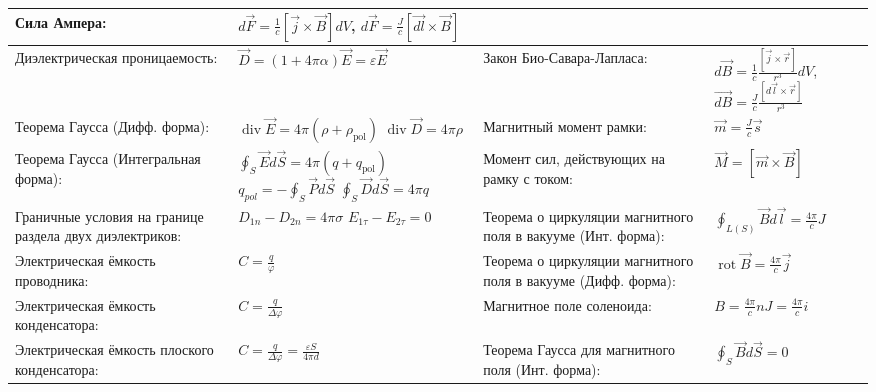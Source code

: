 \documentclass{article}
\begin{document}
\begin{tabular}{ |p{6cm}|p{3.5cm}|p{6cm}|p{3.5cm}|  }
Сила Ампера: & 
$d \vec{F}=\frac{1}{c} [\vec{j} \times \vec{B}] d V$,
$d \vec{F}=\frac{J}{c} [\vec{d{l}} \times \vec{B}]$\\
\hline
Диэлектрическая проницаемость: & $\vec{D}=(1+4 \pi \alpha) \vec{E}=\varepsilon \vec{E}$ &
Закон Био-Савара-Лапласа: & 
$d \vec{B}=\frac{1}{c} \frac{[\vec{j} \times \vec{r}]}{r^{3}} d V$,
$\vec{d{B}}=\frac{J}{c} \frac{[d \vec{l} \times \vec{r}]}{r^{3}}$\\
\hline
Теорема Гаусса (Дифф. форма): & 
$\operatorname{div}{\vec{E}} = 4 \pi \left( \rho+\rho_{\mathrm{pol}} \right)$
$\operatorname{div}{\vec{D}} = 4 \pi \rho$ & Магнитный момент рамки: & $\vec{m}=\frac{J}{c} \vec{s}$ \\
\hline
Теорема Гаусса (Интегральная форма): & $\oint_{S} \vec{E} d \vec{S}=4 \pi \left(q+q_{\mathrm{pol}}\right)$ $q_{pol}=-\oint_{S} \vec{P} d \vec{S}$ $\oint_{S} \vec{D} d \vec{S}=4 \pi q$ &
Момент сил, действующих на рамку с током:& $\vec{M}= [\vec{m} \times \vec{B}]$ \\
\hline
Граничные условия на границе раздела двух диэлектриков: & $D_{1 n}-D_{2 n}=4 \pi \sigma$ $E_{1 \tau}-E_{2 \tau}=0$ &
Теорема о циркуляции магнитного поля в вакууме (Инт. форма): & 
$\oint_{L(S)} \vec{B} d \vec{l}=\frac{4 \pi}{c} J$ \\
\hline
Электрическая ёмкость проводника: & $C= \frac{q}{\varphi}$ &
Теорема о циркуляции магнитного поля в вакууме (Дифф. форма): & 
$\operatorname{rot} \vec{B}=\frac{4 \pi}{c} \vec{j}$\\
\hline
Электрическая ёмкость конденсатора: & $C=\frac {q}{\Delta \varphi}$ &
Магнитное поле соленоида: & $B = \frac{4 \pi}{c} n J=\frac{4 \pi}{c} i$\\
\hline
Электрическая ёмкость плоского конденсатора: & $C=\frac{q}{\Delta \varphi}=\frac{\varepsilon S}{4 \pi d}$ & Теорема Гаусса для магнитного поля (Инт. форма): & $\oint_{S} \vec{B} d \vec{S}=0$ \\
\hline
\end{tabular}

\newpage
\end{document}

